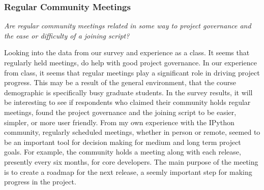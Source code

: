 \subsubsection{Regular Community Meetings}
{\it Are regular community meetings related in some way to project governance and the ease or difficulty of a joining script?}

Looking into the data from our survey and experience as a class. It seems that regularly held meetings, do help with good project governance. In our experience from class, it seems that regular meetings play a significant role in driving project progress. This may be a result of the general environment, that the course demographic is specifically busy graduate students. In the survey results, it will be interesting to see if respondents who claimed their community holds regular meetings, found the project governance and the joining script to be easier, simpler, or more user friendly. From my own experience with the IPython community, regularly scheduled meetings, whether in person or remote, seemed to be an important tool for decision making for medium and long term project goals. For example, the community holds a meeting along with each release, presently every six months, for core developers. The main purpose of the meeting is to create a roadmap for the next release, a seemly important step for making progress in the project.
